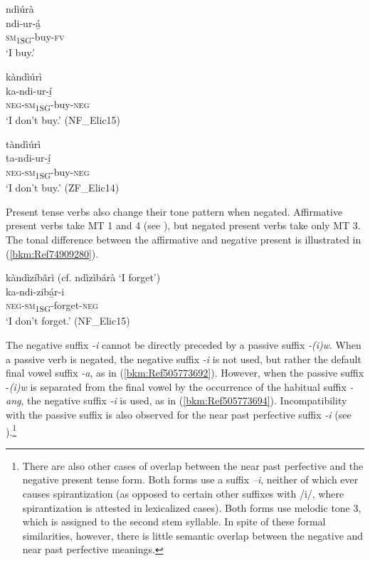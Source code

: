 \ea
\label{bkm:Ref99103972}
\glll ndìúrà\\
ndi-ur-á̲\\
\textsc{sm}\textsubscript{1SG}-buy-\textsc{fv}\\
\glt ‘I buy.’
\z

\ea
\glll kàndìúrì\\
ka-ndi-ur-í̲\\
\textsc{neg}-\textsc{sm}\textsubscript{1SG}-buy-\textsc{neg}\\
\glt ‘I don’t buy.’ (NF\_Elic15)
\z

\ea
\label{bkm:Ref99103973}
\glll tàndìúrì\\
ta-ndi-ur-í̲\\
\textsc{neg}-\textsc{sm}\textsubscript{1SG}-buy-\textsc{neg}\\
\glt ‘I don’t buy.’ (ZF\_Elic14)
\z

Present tense verbs also change their tone pattern when negated. Affirmative present verbs take MT 1 and 4 (see ), but negated present verbs take only MT 3. The tonal difference between the affirmative and negative present is illustrated in (\ref{bkm:Ref74909280}).

\ea
\label{bkm:Ref74909280}
kàndìzíbârì (cf. ndìzìbárà ‘I forget’)\\
\gll ka-ndi-zibá̲r-i\\
\textsc{neg}-\textsc{sm}\textsubscript{1SG}-forget-\textsc{neg}\\
\glt ‘I don’t forget.’ (NF\_Elic15)
\z

The negative suffix \textit{-i} cannot be directly preceded by a passive suffix \textit{-(i)w}. When a passive verb is negated, the negative suffix \textit{-i} is not used, but rather the default final vowel suffix \textit{-a}, as in (\ref{bkm:Ref505773692}). However, when the passive suffix -\textit{(i)w} is separated from the final vowel by the occurrence of the habitual suffix \textit{-ang}, the negative suffix \textit{-i} is used, as in (\ref{bkm:Ref505773694}). Incompatibility with the passive suffix is also observed for the near past perfective suffix \textit{\--i} (see ).\footnote{There are also other cases of overlap between the near past perfective and the negative present tense form. Both forms use a suffix \textit{\-–i}, neither of which ever causes spirantization (as opposed to certain other suffixes with /i/, where spirantization is attested in lexicalized cases). Both forms use melodic tone 3, which is assigned to the second stem syllable. In spite of these formal similarities, however, there is little semantic overlap between the negative and near past perfective meanings.}

